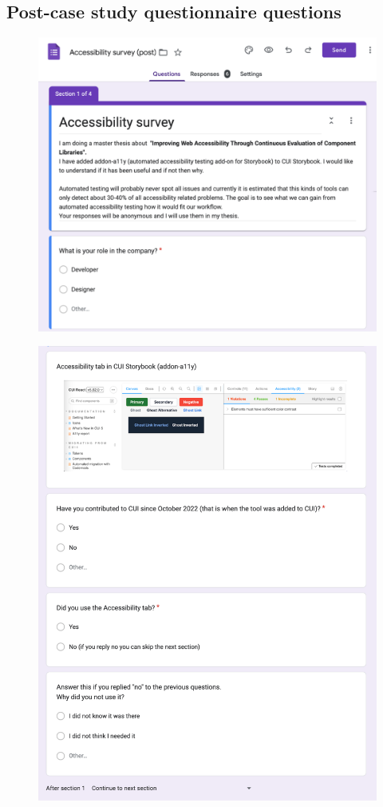 \documentclass{master_thesis}
\begin{document}
\subsection{Post-case study questionnaire questions}\label{appendix:post-survey-questions}
\begin{figure}[H]
	\centering
	\includegraphics[width=\textwidth]{img/surveys/post-survey-1.png}
\end{figure}
\begin{figure}[H]
	\centering
	\includegraphics[width=\textwidth]{img/surveys/post-survey-2.png}
\end{figure}
\end{document}
